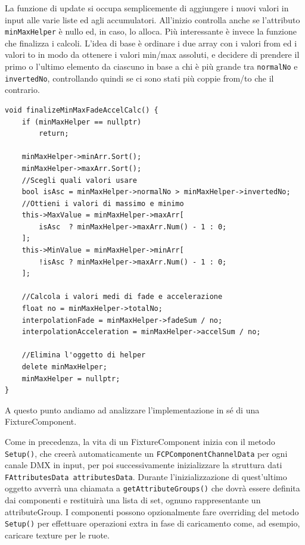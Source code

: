 \documentclass[main.tex]{subfiles}
\begin{document}
La funzione di update si occupa semplicemente di aggiungere i nuovi valori in input alle varie liste ed agli accumulatori. All'inizio controlla anche se l'attributo \lstinline{minMaxHelper} è nullo ed, in caso, lo alloca. Più interessante è invece la funzione che finalizza i calcoli. L'idea di base è ordinare i due array con i valori from ed i valori to in modo da ottenere i valori min/max assoluti, e decidere di prendere il primo o l'ultimo elemento da ciascuno in base a chi è più grande tra \lstinline{normalNo} e \lstinline{invertedNo}, controllando quindi se ci sono stati più coppie from/to  che il contrario.
\begin{lstlisting}
void finalizeMinMaxFadeAccelCalc() {
    if (minMaxHelper == nullptr)
        return;
    
    minMaxHelper->minArr.Sort();
    minMaxHelper->maxArr.Sort();
    //Scegli quali valori usare
    bool isAsc = minMaxHelper->normalNo > minMaxHelper->invertedNo;
    //Ottieni i valori di massimo e minimo
    this->MaxValue = minMaxHelper->maxArr[
        isAsc  ? minMaxHelper->maxArr.Num() - 1 : 0;
    ];
    this->MinValue = minMaxHelper->minArr[
        !isAsc ? minMaxHelper->maxArr.Num() - 1 : 0;
    ];

    //Calcola i valori medi di fade e accelerazione
    float no = minMaxHelper->totalNo;
    interpolationFade = minMaxHelper->fadeSum / no;
    interpolationAcceleration = minMaxHelper->accelSum / no;

    //Elimina l'oggetto di helper
    delete minMaxHelper;
    minMaxHelper = nullptr;
}
\end{lstlisting}

A questo punto andiamo ad analizzare l'implementazione in sé di una FixtureComponent.\newline

Come in precedenza, la vita di un FixtureComponent inizia con il metodo \lstinline{Setup()}, che creerà automaticamente un \lstinline{FCPComponentChannelData} per ogni canale DMX in input, per poi successivamente inizializzare la struttura dati \lstinline{FAttributesData attributesData}. Durante l'inizializzazione di quest'ultimo oggetto avverrà una chiamata a \lstinline{getAttributeGroups()} che dovrà essere definita dai componenti e restituirà una lista di set, ognuno rappresentante un attributeGroup. I componenti possono opzionalmente fare overriding del metodo \lstinline{Setup()} per effettuare operazioni extra in fase di caricamento come, ad esempio, caricare texture per le ruote.
\end{document}
